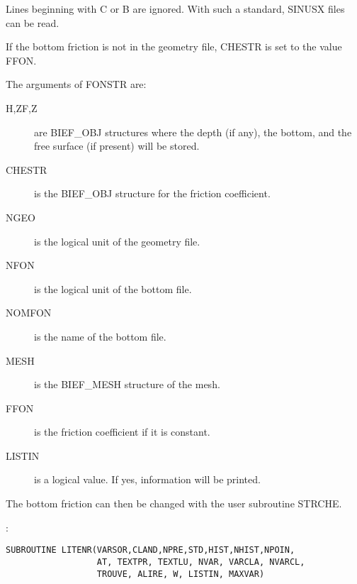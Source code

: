 Lines beginning with C or B are ignored. With such a standard, SINUSX files can
be read.

If the bottom friction is not in the geometry file, CHESTR is set to the value
FFON.

The arguments of FONSTR are:
\begin{description}
  \item [H,ZF,Z] are BIEF\_OBJ structures where the depth (if any), the bottom,
    and the free surface (if present) will be stored.
  \item [CHESTR] is the BIEF\_OBJ structure for the friction coefficient.
  \item [NGEO] is the logical unit of the geometry file.
  \item [NFON] is the logical unit of the bottom file.
  \item [NOMFON] is the name of the bottom file.
  \item [MESH] is the BIEF\_MESH structure of the mesh.
  \item [FFON] is the friction coefficient if it is constant.
  \item [LISTIN] is a logical value. If yes, information will be printed.
\end{description}

The bottom friction can then be changed with the user subroutine STRCHE.

:
\begin{lstlisting}[language=TelFortran]
SUBROUTINE LITENR(VARSOR,CLAND,NPRE,STD,HIST,NHIST,NPOIN,
                  AT, TEXTPR, TEXTLU, NVAR, VARCLA, NVARCL,
                  TROUVE, ALIRE, W, LISTIN, MAXVAR)
\end{lstlisting}

